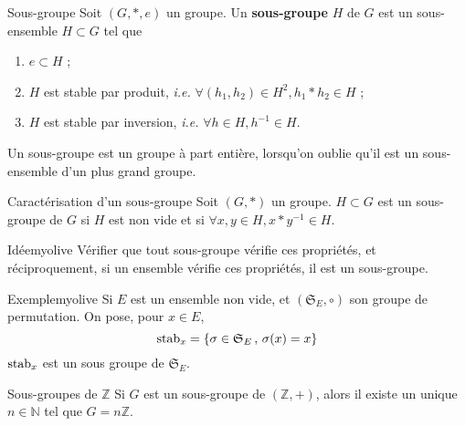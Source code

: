    \begin{defi}{Sous-groupe}{}
        Soit $(G,*,e)$ un groupe. Un \textbf{sous-groupe} $H$ de $G$ est un sous-ensemble $H \subset G$ tel que 
        \begin{enumerate}[label = \arabic*.]
            \item $e \subset H$ ;
            \item $H$ est stable par produit, \textit{i.e.} $\forall (h_1, h_2) \in H^2, h_1 * h_2 \in H$ ;
            \item $H$ est stable par inversion, \textit{i.e.} $\forall h \in H, h^{-1} \in H$.
        \end{enumerate}
        Un sous-groupe est un groupe à part entière, lorsqu’on oublie qu’il est un sous-ensemble d’un plus grand groupe.
    \end{defi}

    \begin{prop}{Caractérisation d’un sous-groupe}{}
        Soit $(G,*)$ un groupe. $H \subset G$ est un sous-groupe de $G$ si $H$ est non vide et si $\forall x,y \in H, x * y^{-1} \in H$.
    \end{prop}

    \begin{demo}{Idée}{myolive}
        Vérifier que tout sous-groupe vérifie ces propriétés, et réciproquement, si un ensemble vérifie ces propriétés, il est un sous-groupe.
    \end{demo}

    \begin{omed}{Exemple}{myolive}
        Si $E$ est un ensemble non vide, et $(\mathfrak{S}_E, \circ)$ son groupe de permutation. On pose, pour $x \in E$, 
        \[ \operatorname{stab}_{x} = \left\{ \sigma \in \mathfrak{S}_E \, , \, \sigma(x) = x \right\} \]   
        $\operatorname{stab}_x$ est un sous groupe de $\mathfrak{S}_E$.
    \end{omed}

    \begin{theo}{Sous-groupes de $\mathbb{Z}$}{}
        Si $G$ est un sous-groupe de $(\mathbb{Z},+)$, alors il existe un unique $n \in \mathbb{N}$ tel que $G = n \mathbb{Z}$.
    \end{theo}

